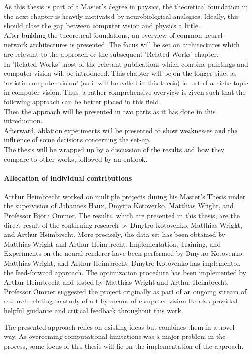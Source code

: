 As this thesis is part of a Master's degree in physics, the theoretical foundation in the next chapter is heavily motivated by neurobiological analogies.
Ideally, this should close the gap between computer vision and physics a little.\\
After building the theoretical foundations, an overview of common neural network architectures is presented.
The focus will be set on architectures which are relevant to the approach or the subsequent 'Related Works' chapter.\\
In 'Related Works' most of the relevant publications which combine paintings and computer vision will be introduced.
This chapter will be on the longer side, as 'artistic computer vision' (as it will be called in this thesis) is sort of a niche topic in computer vision.
Thus, a rather comprehensive overview is given such that the following approach can be better placed in this field.\\
Then the approach will be presented in two parts as it has done in this introduction. \\
Afterward, ablation experiments will be presented to show weaknesses and the influence of some decisions concerning the set-up.\\
The thesis will be wrapped up by a discussion of the results and how they compare to other works, followed by an outlook.

\paragraph{Allocation of individual contributions}
Arthur Heimbrecht worked on multiple projects during his Master's Thesis under the supervision of Johannes Haux, Dmytro Kotovenko, Matthias Wright, and Professor Björn Ommer.
The results, which are presented in this thesis, are the direct result of the continuing research by Dmytro Kotovenko, Matthias Wright, and Arthur Heimbrecht.
More precisely, the data set has been obtained by Matthias Wright and Arthur Heimbrecht.
Implementation, Training, and Experiments on the neural renderer have been performed by Dmytro Kotovenko, Matthias Wright, and Arthur Heimbrecht.
Dmytro Kotovenko has implemented the feed-forward approach.
The optimization procedure has been implemented by Arthur Heimbrecht and tested by Matthias Wright and Arthur Heimbrecht.
Professor Ommer suggested the project originally as part of an ongoing stream of research relating to study of art by means of computer vision
He also provided helpful guidance and critical feedback throughout this work.

The presented approach relies on existing ideas but combines them in a novel way.
As overcoming computational limitations was a major problem in the process, some focus of this thesis will lie on the implementation of the approach.
